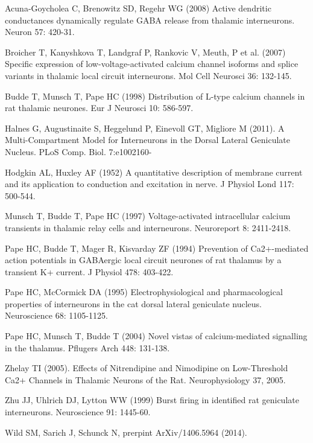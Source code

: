 \documentclass[10pt]{article}
\begin{document}
\begin{thebibliography}{100}
 Acuna-Goycholea C, Brenowitz SD, Regehr WG (2008) Active dendritic conductances dynamically regulate GABA release from thalamic interneurons. Neuron 57: 420-31.

 Broicher T, Kanyshkova T, Landgraf P, Rankovic V, Meuth, P et al. (2007) Specific expression of low-voltage-activated calcium channel isoforms and splice variants in thalamic local circuit interneurons. Mol Cell Neurosci 36: 132-145.

 Budde T, Munsch T, Pape HC (1998) Distribution of L-type calcium channels in rat thalamic neurones. Eur J Neurosci 10: 586-597.

 Halnes G, Augustinaite S, Heggelund P, Einevoll GT, Migliore M (2011). A Multi-Compartment Model for Interneurons in the Dorsal Lateral Geniculate Nucleus. PLoS Comp. Biol. 7:e1002160-

 Hodgkin AL, Huxley AF (1952) A quantitative description of membrane current and its application to conduction and excitation in nerve. J Physiol Lond 117: 500-544.

 Munsch T, Budde T, Pape HC (1997) Voltage-activated intracellular calcium transients in thalamic relay cells and interneurons. Neuroreport 8: 2411-2418.

 Pape HC, Budde T, Mager R, Kisvarday ZF (1994) Prevention of Ca2+-mediated action potentials in GABAergic local circuit neurones of rat thalamus by a transient K+ current. J Physiol 478: 403-422.

 Pape HC, McCormick DA (1995) Electrophysiological and pharmacological properties of interneurons in the cat dorsal lateral geniculate nucleus. Neuroscience 68: 1105-1125.

 Pape HC, Munsch T, Budde T (2004) Novel vistas of calcium-mediated signalling in the thalamus.
Pflugers Arch 448: 131-138.

 Zhelay TI (2005). Effects of Nitrendipine and Nimodipine on Low-Threshold Ca2+ Channels in Thalamic Neurons of the Rat. Neurophysiology 37, 2005.

 Zhu JJ, Uhlrich DJ, Lytton WW (1999) Burst firing in identified rat geniculate interneurons. Neuroscience 91: 1445-60.

 Wild SM, Sarich J, Schunck N, prerpint ArXiv/1406.5964 (2014).
\end{thebibliography}
\end{document}

